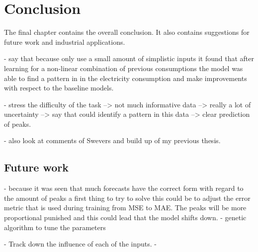 \chapter{Conclusion}
\label{cha:conclusion}
The final chapter contains the overall conclusion. It also contains
suggestions for future work and industrial applications.

- say that because only use a small amount of simplistic inputs it found that after learning for a non-linear combination of previous consumptions the model was able to find a pattern in in the electricity consumption and make improvements with respect to the baseline models.

- stress the difficulty of the task --> not much informative data --> really a lot of uncertainty --> say that could identify a pattern in this data --> clear prediction of peaks.

- also look at comments of Swevers and build up of my previous thesis.

\section{Future work}
- because it was seen that much forecasts have the correct form with regard to the amount of peaks a first thing to try to solve this could be to adjust the error metric that is used during training from MSE to MAE. The peaks will be more proportional punished and this could lead that the model shifts down. 
- genetic algorithm to tune the parameters

- Track down the influence of each of the inputs.
- 

